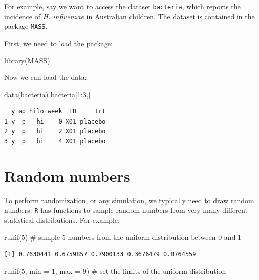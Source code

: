 \documentclass[
  letterpaper,
  DIV=11,
  numbers=noendperiod]{scrreprt}
\newenvironment{Shaded}{\begin{snugshade}}{\end{snugshade}}
\newcommand{\AttributeTok}[1]{\textcolor[rgb]{0.40,0.45,0.13}{#1}}
\newcommand{\CommentTok}[1]{\textcolor[rgb]{0.37,0.37,0.37}{#1}}
\newcommand{\DecValTok}[1]{\textcolor[rgb]{0.68,0.00,0.00}{#1}}
\newcommand{\FunctionTok}[1]{\textcolor[rgb]{0.28,0.35,0.67}{#1}}
\newcommand{\NormalTok}[1]{\textcolor[rgb]{0.00,0.23,0.31}{#1}}
\newcommand{\SpecialCharTok}[1]{\textcolor[rgb]{0.37,0.37,0.37}{#1}}
\begin{document}
For example, say we want to access the dataset \texttt{bacteria}, which
reports the incidence of \emph{H. influenzae} in Australian children.
The dataset is contained in the package \texttt{MASS}.

First, we need to load the package:

\begin{Shaded}
\begin{Highlighting}[]
\FunctionTok{library}\NormalTok{(MASS)}
\end{Highlighting}
\end{Shaded}

Now we can load the data:

\begin{Shaded}
\begin{Highlighting}[]
\FunctionTok{data}\NormalTok{(bacteria)}
\NormalTok{bacteria[}\DecValTok{1}\SpecialCharTok{:}\DecValTok{3}\NormalTok{,]}
\end{Highlighting}
\end{Shaded}

\begin{verbatim}
  y ap hilo week  ID     trt
1 y  p   hi    0 X01 placebo
2 y  p   hi    2 X01 placebo
3 y  p   hi    4 X01 placebo
\end{verbatim}

\hypertarget{random-numbers}{%
\section{Random numbers}\label{random-numbers}}

To perform randomization, or any simulation, we typically need to draw
random numbers. \texttt{R} has functions to sample random numbers from
very many different statistical distributions. For example:

\begin{Shaded}
\begin{Highlighting}[]
\FunctionTok{runif}\NormalTok{(}\DecValTok{5}\NormalTok{) }\CommentTok{\# sample 5 numbers from the uniform distribution between 0 and 1}
\end{Highlighting}
\end{Shaded}

\begin{verbatim}
[1] 0.7630441 0.6759857 0.7900133 0.3676479 0.8764559
\end{verbatim}

\begin{Shaded}
\begin{Highlighting}[]
\FunctionTok{runif}\NormalTok{(}\DecValTok{5}\NormalTok{, }\AttributeTok{min =} \DecValTok{1}\NormalTok{, }\AttributeTok{max =} \DecValTok{9}\NormalTok{) }\CommentTok{\# set the limits of the uniform distribution}
\end{Highlighting}
\end{Shaded}
\end{document}

